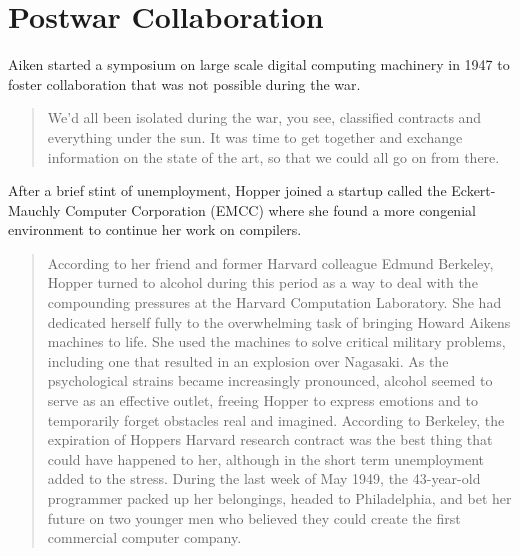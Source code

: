 \section{Postwar Collaboration}

Aiken started a symposium on large scale digital computing machinery in 1947 to foster
collaboration that was not possible during the war.

\begin{quotation}
We'd all been isolated during the war, you see, classified contracts and 
everything under the sun. It was time to get together and exchange information 
on the state of the art, so that we could all go on from there.
\end{quotation}


After a brief stint of unemployment, Hopper joined a startup called the Eckert-Mauchly Computer Corporation (EMCC)
where she found a more congenial environment to continue her work on compilers.

\begin{quotation}
According to her friend and former Harvard colleague Edmund Berkeley, Hopper 
turned to alcohol during this period as a way to deal with the compounding 
pressures at the Harvard Computation Laboratory. She had dedicated herself 
fully to the overwhelming task of bringing Howard Aikens machines to life.  She 
used the machines to solve critical military problems, including one that 
resulted in an explosion over Nagasaki.  As the psychological strains became 
increasingly pronounced, alcohol seemed to serve as an effective outlet, 
freeing Hopper to express emotions and to temporarily forget obstacles real and 
imagined.  According to Berkeley, the expiration of Hoppers Harvard research 
contract was the best thing that could have happened to her, although in the 
short term unemployment added to the stress.  During the last week of May 1949, 
the 43-year-old programmer packed up her belongings, headed to Philadelphia, 
and bet her future on two younger men who believed they could create the first 
commercial computer 
company.\cite{grace_hopper_and_the_invention_of_the_information_age_2009}
\end{quotation}

